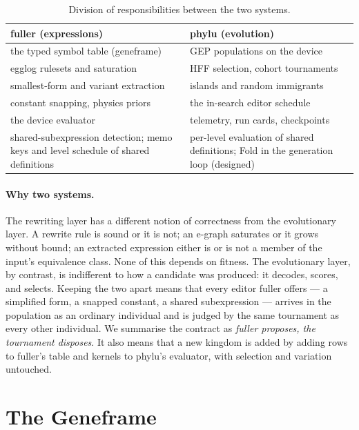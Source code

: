 \documentclass[sigconf,nonacm]{acmart}
\begin{document}
\begin{table}[t]
\caption{Division of responsibilities between the two systems.}
\label{tab:ownership}
\small
\begin{tabular}{@{}p{}p{}@{}}
\toprule
fuller (expressions) & phylu (evolution) \\
\midrule
the typed symbol table (geneframe) & GEP populations on the device \\
egglog rulesets and saturation & HFF selection, cohort tournaments \\
smallest-form and variant extraction & islands and random immigrants \\
constant snapping, physics priors & the in-search editor schedule \\
the device evaluator & telemetry, run cards, checkpoints \\
shared-subexpression detection; memo keys and level schedule of shared definitions & per-level evaluation of shared definitions; Fold in the generation loop (designed) \\
\bottomrule
\end{tabular}
\end{table}

\paragraph{Why two systems.} The rewriting layer has a different notion of
correctness from the evolutionary layer. A rewrite rule is sound or it is not;
an e-graph saturates or it grows without bound; an extracted expression either
is or is not a member of the input's equivalence class. None of this depends on fitness. The
evolutionary layer, by contrast, is indifferent to how a candidate was produced:
it decodes, scores, and selects. Keeping the two apart means that every editor
fuller offers --- a simplified form, a snapped constant, a shared subexpression
--- arrives in the population as an ordinary individual and is judged by the
same tournament as every other individual. We summarise the contract as \emph{fuller
proposes, the tournament disposes}. It also means that a new kingdom is added
by adding rows to fuller's table and kernels to phylu's evaluator, with
selection and variation untouched.

\section{The Geneframe}
\label{sec:geneframe}
\end{document}
